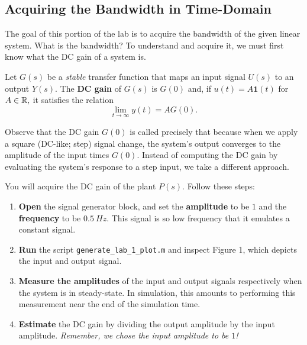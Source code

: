 \subsection{Acquiring the Bandwidth in Time-Domain}
The goal of this portion of the lab is to acquire the bandwidth of the
given linear system. What is the bandwidth? To understand and acquire it,
we must first know what the DC gain of a system is.
%
\begin{definition}[DC Gain]
  Let \(G(s)\) be a \emph{stable} transfer function
  that maps an input signal \(U(s)\) to an
  output \(Y(s).\) The \textbf{DC gain} of \(G(s)\) is \(G(0)\) and,
  if \(u(t) = A \mathbf{1}(t)\) for \(A \in \mathbb{R},\) it satisfies the relation
  \[
    \lim_{t\to \infty} y(t) = A G(0).
  \]
\end{definition}
%
Observe that the DC gain \(G(0)\) is called precisely that because when we
apply a square (DC-like; step) signal change, the system's output converges
to the amplitude of the input times \(G(0).\)
%
Instead of computing the DC gain by evaluating the system's response to a step
input, we take a different approach.
%
\begin{procedure}
  You will acquire the DC gain of the plant \(P(s)\). Follow these steps:
  \begin{enumerate}[label=(\arabic*)]
    \item{
      \textbf{Open} the signal generator block, and set the
      \textbf{amplitude} to be \(1\) and the \textbf{frequency}
      to be \(\SI{0.5}{Hz}.\) This signal is so low frequency that it
      emulates a constant signal.
    }
    \item{
      \textbf{Run} the script \texttt{generate\_lab\_1\_plot.m} and inspect
      Figure 1, which depicts the input and output signal.
    }
    \item{
      \textbf{Measure the amplitudes} of the input and output signals
      respectively when the system is in steady-state. In simulation, this
      amounts to performing this measurement near the end of the simulation
      time.
    }
    \item{
      \textbf{Estimate} the DC gain by dividing the output amplitude
      by the input amplitude. \emph{Remember, we chose the input amplitude
      to be \(1\)!}
    }
  \end{enumerate}
  \label{lab1:p1}
\end{procedure}
%
